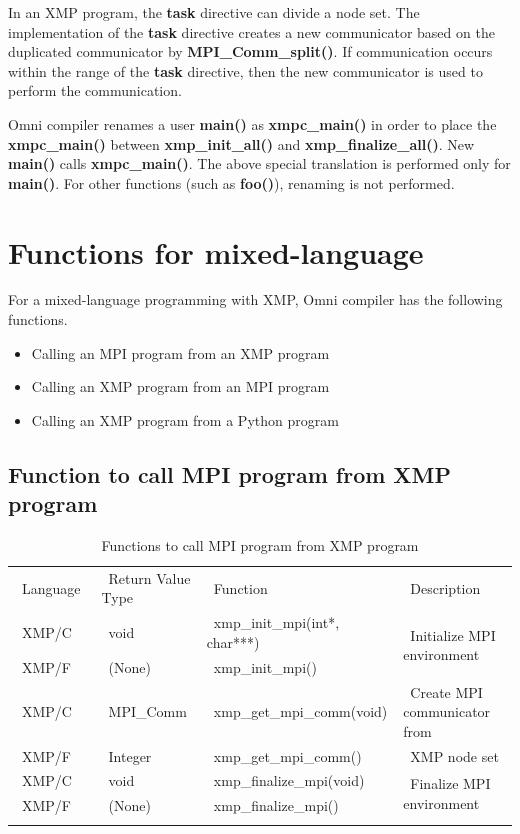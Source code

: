 \documentclass[graybox]{svmult}
\begin{document}
In an XMP program,
the \textbf{task} directive can divide a node set.
The implementation of the \textbf{task} directive creates a new communicator based on the duplicated communicator by  {\bf MPI\_Comm\_split()}.
If communication occurs within the range of the \textbf{task} directive,
then the new communicator is used to perform the communication.

Omni compiler renames a user {\bf main()} as  {\bf xmpc\_main()} in order to place the {\bf xmpc\_main()} between  {\bf xmp\_init\_all()} and {\bf xmp\_finalize\_all()}.
New {\bf main()} calls {\bf xmpc\_main()}.
The above special translation is performed only for {\bf main()}.
For other functions (such as {\bf foo()}), renaming is not performed.
\section{Functions for mixed-language}
For a mixed-language programming with XMP, Omni compiler has the following functions.

\begin{itemize}
\item Calling an MPI program from an XMP program
\item Calling an XMP program from an MPI program
\item Calling an XMP program from a Python program
\end{itemize}

\subsection{Function to call MPI program from XMP program}\label{sec:MPIfromXMP}
\begin{table}[h]
\centering
\caption{Functions to call MPI program from XMP program\cite{pgas-ei}} \label{tab:MPIfromXMP}
\begin{tabular}{l|l|l|l}
\hline\noalign{\smallskip}
~Language~  & ~Return Value Type~ & ~Function~ & ~Description~ \\ 
\noalign{\smallskip}\svhline\noalign{\smallskip}
~XMP/C      & ~void              & ~xmp\_init\_mpi(int*, char***)~ & \multirow{2}{*}{~Initialize MPI environment}\\
~XMP/F       & ~(None)          & ~xmp\_init\_mpi() & \\  
\noalign{\smallskip}\hline\noalign{\smallskip}
~XMP/C      & ~MPI\_Comm & ~xmp\_get\_mpi\_comm(void) & ~Create MPI communicator from \\
~XMP/F       & ~Integer         & ~xmp\_get\_mpi\_comm() &   ~XMP node set \\
\noalign{\smallskip}\hline\noalign{\smallskip}
~XMP/C      & ~void              & ~xmp\_finalize\_mpi(void) & \multirow{2}{*}{~Finalize MPI environment}\\
~XMP/F       & ~(None)          & ~xmp\_finalize\_mpi() & \\ 
\noalign{\smallskip}\hline\noalign{\smallskip}
\end{tabular}
\end{table}
\end{document}
